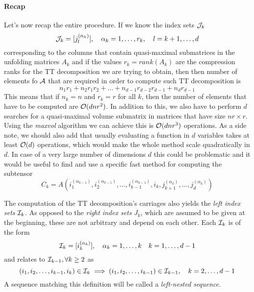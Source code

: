 \paragraph{Recap}
Let's now recap the entire procedure. If we know the index sets $\mathcal{J}_k$
\begin{equation}
  \mathcal{J}_k = [j_l^{(\alpha_k)}],\quad \alpha_k = 1,\ldots,r_k,\quad l = k+1,\ldots,d
\end{equation}
corresponding to the columns that contain quasi-maximal submatrices in the unfolding matrices $A_k$ and if the values $r_k = rank(A_k)$ are the compression ranks for the TT decomposition we are trying to obtain, then then number of elements fo $\mathcal{A}$ that are required in order to compute such TT decomposition is
\begin{equation*}
  n_1 r_1 + n_2 r_1 r_2 + \ldots + n_{d-1} r_{d-2} r_{d-1} + n_d r_{d-1}
\end{equation*}
This means that if $n_k = n$ and $r_k = r$ for all $k$, then the number of elements that have to be computed are $\mathcal{O}(dnr^2)$.
In addition to this, we also have to perform $d$ searches for a quasi-maximal volume submatrix in matrices that have size $nr \times r$. Using the \emph{maxvol} algorithm we can achieve this is $\mathcal{O}(dnr^3)$ operations.
As a side note, we should also add that usually evaluating a function in $d$ variables takes at least $\mathcal{O}(d)$ operations, which would make the whole method scale quadratically in $d$. In case of a very large number of dimensions $d$ this could be problematic and it would be useful to find and use a specific fast method for computing the subtensor
\begin{equation}
  C_k = A(i_1^{(\alpha_{k-1})},i_2^{(\alpha_{k-1})},\ldots,i_{k-1}^{(\alpha_{k-1})},i_k,j_{k+1}^{(\alpha_k)},\ldots,j_d^{(\alpha_k)})
\end{equation}

The computation of the TT decomposition's carriages also yields the \emph{left index sets} $\mathcal{I}_k$. As opposed to the \emph{right index sets} $J_k$, which are assumed to be given at the beginning, these are not arbitrary and depend on each other. Each $\mathcal{I}_k$ is of the form
\begin{equation}
  \mathcal{I}_k = [i_k^{(\alpha_k)}], \quad \alpha_k = 1,\ldots,k \quad k = 1,\ldots,d-1
\end{equation}
and relates to $\mathcal{I}_{k-1}, \forall k \geq 2$ as
\begin{equation}
  (i_1,i_2,\ldots,i_{k-1},i_k) \in \mathcal{I}_k \implies (i_1,i_2,\ldots,i_{k-1}) \in \mathcal{I}_{k-1}, \quad k=2,\ldots,d-1
\end{equation}
A sequence matching this definition will be called a \emph{left-nested sequence}.

